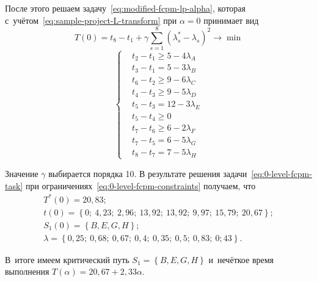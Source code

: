 После этого решаем задачу~\eqref{eq:modified-fcpm-lp-alpha}, которая с~учётом~\eqref{eq:sample-project-L-transform} при $\alpha=0$ принимает вид
\begin{equation}
\label{eq:0-level-fcpm-task}
  T\left( 0 \right)=t_8-t_1+\gamma \sum\limits_{s=1}^{8}\left( \lambda_{s}^{*}-\lambda_s \right)^{2}\to \min
\end{equation}
\begin{equation}
\label{eq:0-level-fcpm-constraints}
  \left\{ \begin{aligned}
    & t_2-t_1 \geqslant 5-4\lambda_A \\ 
    & t_3-t_1=5-3\lambda_B \\ 
    & t_6-t_2 \geqslant 9-6\lambda_C \\ 
    & t_4-t_3 \geqslant 9-5\lambda_D \\ 
    & t_5-t_3=12-3\lambda_E \\ 
    & t_5-t_4 \geqslant 0 \\ 
    & t_7-t_6 \geqslant 6-2\lambda_F \\ 
    & t_7-t_5=6-5\lambda_G \\ 
    & t_8-t_7=7-5\lambda_H
  \end{aligned} \right.
\end{equation}

Значение $\gamma$ выбирается порядка 10. В результате решения задачи~\eqref{eq:0-level-fcpm-task} при ограничениях~\eqref{eq:0-level-fcpm-constraints} получаем, что
\begin{gather*}
  T^*\left( 0 \right)=20,83; \\
  t\left(0\right)=\left\{ 0;\ 4,23;\ 2,96;\ 13,92;\ 13,92;\ 9,97;\ 15,79;\ 20,67 \right\}; \\ 
  S_1\left( 0 \right)=\left\{ B,E,G,H \right\}; \\ 
  \lambda =\left\{ 0,25;\ 0,68;\ 0,67;\ 0,4;\ 0,35;\ 0,5;\ 0,83;\ 0;43 \right\}.
\end{gather*}

В~итоге имеем критический путь $S_1=\left\{ B,E,G,H \right\}$ и~нечёткое время выполнения $T\left( \alpha \right)=20,67+2,33\alpha$.
